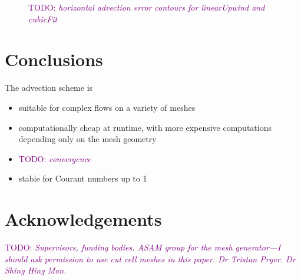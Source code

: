 \documentclass[times]{elsarticle}
\newcommand{\TODO}[1]{\textcolor{purple}{TODO: \emph{#1}}}
\begin{document}
\begin{figure}
	\caption{\TODO{horizontal advection error contours for linearUpwind and cubicFit}}
\end{figure}





\section{Conclusions}

The advection scheme is
\begin{itemize}
	\item suitable for complex flows on a variety of meshes
	\item computationally cheap at runtime, with more expensive computations depending only on the mesh geometry
	\item \TODO{convergence}
	\item stable for Courant numbers up to 1
\end{itemize}

\section{Acknowledgements}
\TODO{Supervisors, funding bodies.  ASAM group for the mesh generator---I should ask permission to use cut cell meshes in this paper.  Dr Tristan Pryer.  Dr Shing Hing Man.}





\end{document}
